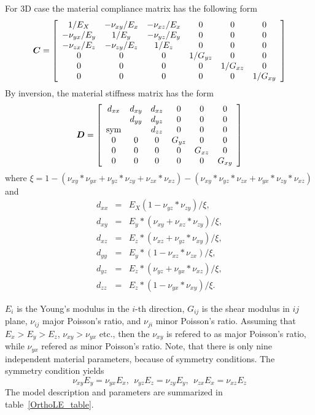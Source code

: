 \documentclass[a4paper]{article}
\newcommand{\mbf}[1]{\mbox{\boldmath$#1$}}
\begin{document}
For 3D case the material compliance matrix has the following form
\begin{equation}
  \mbf{C}=\left[\begin{array}{cccccc}
1/E_X & -\nu_{xy}/E_x& -\nu_{xz}/E_x& 0& 0&0\\
-\nu_{yx}/E_y & 1/E_y& -\nu_{yz}/E_y& 0& 0&0\\
-\nu_{zx}/E_z & -\nu_{zy}/E_z& 1/E_z& 0& 0&0\\
0 & 0 & 0 & 1/G_{yz} & 0 & 0\\
0 & 0 & 0 & 0 & 1/G_{xz} & 0\\
0 & 0 & 0 & 0 & 0 & 1/G_{xy}
 \end{array}\right]
\end{equation}
By inversion, the material stiffness matrix has the form
\begin{equation}
  \mbf{D}=\left[\begin{array}{cccccc}
d_{xx} & d_{xy} & d_{xz} & 0 & 0 & 0\\
& d_{yy} & d_{yz} & 0 & 0 & 0\\
\rm {sym} & & d_{zz} & 0 & 0 & 0\\
0 & 0 & 0 & G_{yz} & 0 & 0\\
0 & 0 & 0 & 0 & G_{xz} & 0\\
0 & 0 & 0 & 0 & 0 & G_{xy}
 \end{array}\right]
\end{equation}
where $\xi=1-(\nu_{xy}*\nu_{yx}+\nu_{yz}*\nu_{zy}+\nu_{zx}*\nu_{xz})-(\nu_{xy}*\nu_{yz}*\nu_{zx}+\nu_{yx}*\nu_{zy}*\nu_{xz})$ and
\begin{eqnarray}
  d_{xx}&=&E_X(1-\nu_{yz}*\nu_{zy})/\xi,\\
  d_{xy}&=&E_y*(\nu_{xy}+\nu_{xz}*\nu_{zy})/\xi,\\
  d_{xz}&=&E_z*(\nu_{xz}+\nu_{yz}*\nu_{xy})/\xi,\\
  d_{yy}&=&E_y*(1-\nu_{xz}*\nu_{zx})/\xi,\\
  d_{yz}&=&E_z*(\nu_{yz}+\nu_{yx}*\nu_{xz})/\xi,\\
  d_{zz}&=&E_z*(1-\nu_{yx}*\nu_{xy})/\xi.
\end{eqnarray}


 $E_i$ is the Young's modulus in the $i$-th direction, $G_{ij}$ is the shear modulus in $ij$ plane, $\nu_{ij}$ major Poisson's ratio, and $\nu_{ji}$ minor Poisson's ratio. Assuming that $E_x>E_y>E_z$, $\nu_{xy} > \nu_{yx}$ etc., then the $\nu_{xy}$ is refered to as major Poisson's ratio, while $\nu_{yx}$ refered as minor Poisson's ratio.
Note, that there is only nine independent material parameters,
because of symmetry conditions. The symmetry condition yields
$$\nu_{xy}E_y=\nu_{yx}E_x,\ \ \nu_{yz}E_z=\nu_{zy}E_y,\ \ \nu_{zx}E_x=\nu_{xz}E_z$$
The model description and parameters are summarized
in table~\ref{OrthoLE_table}.
\end{document}
